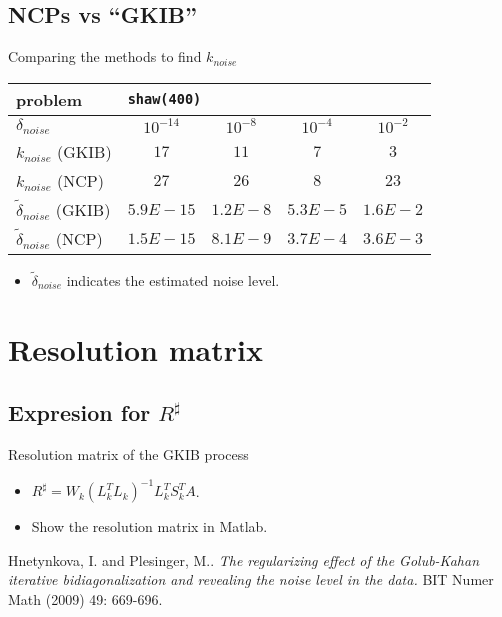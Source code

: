 \documentclass{beamer}
\begin{document}
\subsection{NCPs vs ``GKIB''}
\begin{frame}{Comparing the methods to find $k_{noise}$}
  \begin{center}
    \begin{tabular}{l||c|c|c|c}
      \multicolumn{1}{l||}{problem} & \multicolumn{4}{l}{\texttt{shaw(400)}} \\
      \hline \hline 
      $\delta_{noise}$ & $10^{-14}$ & $10^{-8}$ & $10^{-4}$ & $10^{-2}$ \\
      \hline
      $k_{noise}$ (GKIB) & $17$ & $11$ & $7$ & $3$ \\
      \hline
      $k_{noise}$ (NCP) & $27$ & $26$ & $8$ & $23$ \\
      \hline
      $\tilde{\delta}_{noise}$ (GKIB) & $5.9E-15$ & $1.2E-8$ & $5.3E-5$ &
      $1.6E-2$ \\
      \hline
      $\tilde{\delta}_{noise}$ (NCP) & $1.5E-15$ & $8.1E-9$ & $3.7E-4$ & 
      $3.6E-3$ \\
    \end{tabular}
  \end{center}
  \begin{itemize}
    \item $\tilde{\delta}_{noise}$ indicates the estimated noise level.
    \end{itemize}
\end{frame}

\section{Resolution matrix}
\subsection{Expresion for $R^{\sharp}$}
\begin{frame}{Resolution matrix of the GKIB process}
  \begin{itemize}
    \item $R^{\sharp} = W_{k}(L_{k}^{T}L_{k})^{-1}L_{k}^{T}S_{k}^{T}A$.
    \item Show the resolution matrix in Matlab.
    \end{itemize}
\end{frame}

\begin{thebibliography}{1}
    Hnetynkova, I. and Plesinger, M.. 
    \emph{The regularizing effect of the Golub-Kahan iterative bidiagonalization 
      and revealing the noise level in the data.}
      BIT Numer Math (2009) 49: 669-696.
\end{thebibliography}
\end{document}
